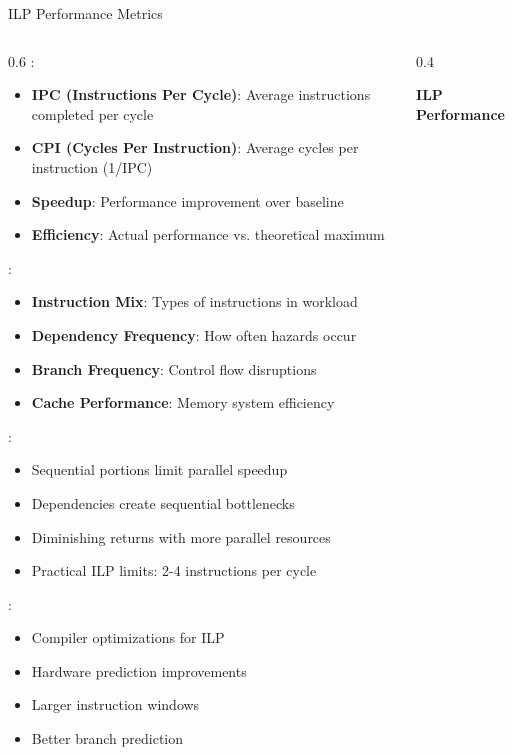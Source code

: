 \begin{frame}{ILP Performance Metrics}
\begin{columns}
\begin{column}{0.6\textwidth}
:
\begin{itemize}
\item \textbf{IPC (Instructions Per Cycle)}: Average instructions completed per cycle
\item \textbf{CPI (Cycles Per Instruction)}: Average cycles per instruction (1/IPC)
\item \textbf{Speedup}: Performance improvement over baseline
\item \textbf{Efficiency}: Actual performance vs. theoretical maximum
\end{itemize}

\vspace{0.3cm}
:
\begin{itemize}
\item \textbf{Instruction Mix}: Types of instructions in workload
\item \textbf{Dependency Frequency}: How often hazards occur
\item \textbf{Branch Frequency}: Control flow disruptions
\item \textbf{Cache Performance}: Memory system efficiency
\end{itemize}

\vspace{0.3cm}
:
\begin{itemize}
\item Sequential portions limit parallel speedup
\item Dependencies create sequential bottlenecks
\item Diminishing returns with more parallel resources
\item Practical ILP limits: 2-4 instructions per cycle
\end{itemize}

\vspace{0.3cm}
:
\begin{itemize}
\item Compiler optimizations for ILP
\item Hardware prediction improvements
\item Larger instruction windows
\item Better branch prediction
\end{itemize}
\end{column}
\begin{column}{0.4\textwidth}
\begin{center}
\textbf{ILP Performance}
\vspace{0.3cm}


\end{center}
\end{column}
\end{columns}
\end{frame}
